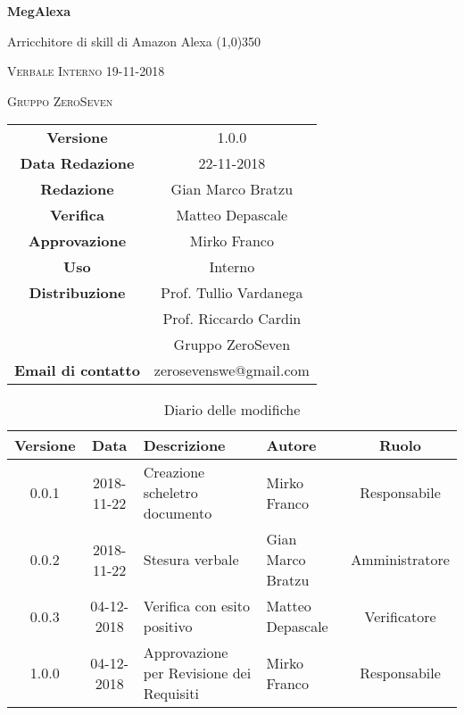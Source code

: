 \documentclass[a4paper,12pt]{article}
\author{Mirko Franco}
\date{26-11-2018}
\begin{document}
\begin{titlepage}
	\centering
	{\huge\bfseries MegAlexa\par}
	Arricchitore di skill di Amazon Alexa
	\line(1,0){350} \\
	{\scshape\LARGE Verbale Interno 19-11-2018 \par}
	\vspace{1cm}
	{\scshape Gruppo ZeroSeven \par}
	\logo
	\begin{tabular}{c|c}
		{\hfill \textbf{Versione}} 			& 1.0.0				\\
		{\hfill\textbf{Data Redazione}} 	& 22-11-2018		\\ 
		{\hfill\textbf{Redazione}} 			&  		Gian Marco Bratzu			\\ 
		{\hfill\textbf{Verifica}} 				&  		Matteo Depascale		\\ 
		{\hfill\textbf{Approvazione}} 		&  		Mirko Franco	\\ 
		{\hfill\textbf{Uso}} 					& 	Interno	\\ 
		{\hfill\textbf{Distribuzione}} 			& 			Prof. Tullio Vardanega \\ & Prof. Riccardo Cardin \\ & Gruppo ZeroSeven		\\ 
		{\hfill\textbf{Email di contatto}} & zerosevenswe@gmail.com \\
	\end{tabular}
\end{titlepage}
	

	
	\label{LastFrontPage}
	

	\newpage
	\cleardoublepage
	\begin{table}[tbph]
		\centering
		\begin{tabularx}{\textwidth}{|c|c|X|X|c|}
			\hline
			\textbf{Versione} & \textbf{Data} & \textbf{Descrizione} & \textbf{Autore} & \textbf{Ruolo} \\
			\hline
			0.0.1 & 2018-11-22 & Creazione scheletro documento
			 & Mirko Franco & Responsabile\\
			\hline
			0.0.2 & 2018-11-22 & Stesura verbale & Gian Marco Bratzu & Amministratore \\
			\hline
			0.0.3 & 04-12-2018 & Verifica con esito positivo
				 & Matteo Depascale & Verificatore \\
			\hline
			1.0.0 & 04-12-2018 & 
					Approvazione per Revisione dei Requisiti
			& Mirko Franco &  Responsabile \\
			\hline
		\end{tabularx}
		\caption{Diario delle modifiche}
	\end{table}
	
\end{document}

